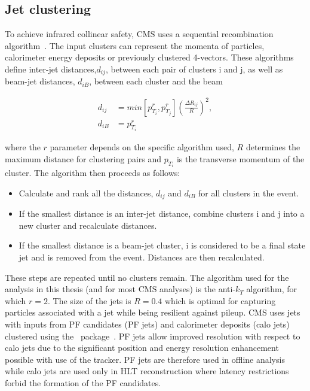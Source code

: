 \subsection{Jet clustering}

To achieve infrared collinear safety, CMS uses a sequential recombination algorithm~\cite{antikt}. The input clusters can represent
the momenta of particles, calorimeter energy deposits or previously clustered
4-vectors. These algorithms define inter-jet distances,$d_{ij}$, between each pair of clusters i and j, 
as well as beam-jet distances, $d_{iB}$, between each cluster and the beam 

\begin{align}
d_{ij} &= min\left[p^r_{T_i},p^r_{T_j}\right]\left(\frac{\Delta R_{ij}}{R}\right)^2,\nonumber\\
d_{iB} &= p^r_{T_i}
\end{align}

where the $r$ parameter depends on the specific algorithm used, $R$ determines the maximum distance
for clustering pairs and $p_{T_i}$ is the transverse momentum of the cluster. The algorithm then proceeds
as follows:
\begin{itemize}
\item Calculate and rank all the distances, $d_{ij}$ and $d_{iB}$ for all clusters in the event.
\item If the smallest distance is an inter-jet distance, combine clusters i and j into a new cluster and recalculate distances.
\item If the smallest distance is a beam-jet cluster, i is considered to be a final state jet and is removed from the event. Distances 
are then recalculated.
\end{itemize}

These steps are repeated until no clusters remain. The algorithm used for the analysis in this thesis (and for most CMS analyses) is 
the anti-$k_T$ algorithm, for which $r=2$. The size of the jets is $R=0.4$ which is optimal for capturing particles
associated with a jet while being resilient against pileup. CMS uses jets with inputs from PF candidates (PF jets) and calorimeter deposits (calo jets)
clustered using the \FASTJET~package~\cite{fastjet}. PF jets allow improved resolution with respect to calo jets due to the significant position and energy resolution 
enhancement possible with use of the tracker. PF jets are therefore used in offline analysis while calo jets are used only in HLT reconstruction
where latency restrictions forbid the formation of the PF candidates. 

